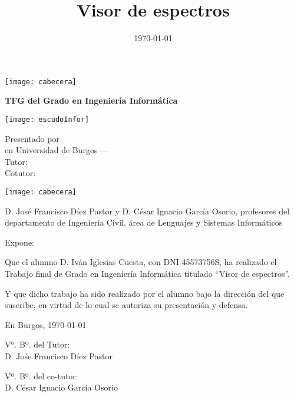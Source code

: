 \documentclass[a4paper,12pt,twoside]{memoir}
\title{Visor de espectros}
\author{\nombre}
\date{\today}
\makeatletter
\def\maketitle{
	\null
	\thispagestyle{empty}
	\noindent\texttt{[image: cabecera]}\vspace{1cm}%
	\vfill
	\colorbox{cpardoBox}{%
		\begin{minipage}{.8\textwidth}
			\vspace{.5cm}\Large
			\begin{center}
				\textbf{TFG del Grado en Ingeniería Informática}\vspace{.6cm}\\
				\textbf{\LARGE\@title{}}
			\end{center}
			\vspace{.2cm}
		\end{minipage}
		
	}%
	\hfill\begin{minipage}{.20\textwidth}
		\texttt{[image: escudoInfor]}
	\end{minipage}
	\vfill
	\begin{center}%
		{%
			\noindent\LARGE
			Presentado por \@author{}\\ 
			en Universidad de Burgos --- \@date{}\\
			Tutor: \@tutor{}\\
			Cotutor: \@cotutor{}\\
		}%
	\end{center}%
	\null
	\cleardoublepage
}
\newcommand{\nombre}{Iván Iglesias Cuesta} %
\makeatother
\begin{document}
	
	\maketitle
	
	
	\newpage\null\thispagestyle{empty}\newpage
	
	
	
	\thispagestyle{empty}
	
	
	\noindent\texttt{[image: cabecera]}\vspace{1cm}
	
	\noindent D. José Francisco Díez Pastor y D. César Ignacio García Osorio, profesores del
	departamento de Ingeniería Civil, área de Lenguajes y Sistemas Informáticos
	
	\noindent Expone:
	
	\noindent Que el alumno D. \nombre, con DNI 45573756S, ha realizado el Trabajo final
	de Grado en Ingeniería Informática titulado ``Visor de espectros''. 
	
	\noindent Y que dicho trabajo ha sido realizado por el alumno bajo la dirección
	del que suscribe, en virtud de lo cual se autoriza su presentación y defensa.
	
	\begin{center} %
		En Burgos, {\large \today}
	\end{center}
	
	\vfill\vfill\vfill
	
	\begin{minipage}{0.45\textwidth}
		\begin{flushleft} %
			Vº. Bº. del Tutor:\\[2cm]
			D. Jośe Francisco Díez Pastor
		\end{flushleft}
	\end{minipage}
	\hfill
	\begin{minipage}{0.45\textwidth}
		\begin{flushleft} %
			Vº. Bº. del co-tutor:\\[2cm]
			D. César Ignacio García Osorio
		\end{flushleft}
	\end{minipage}
	\hfill
	
	\vfill
	
	
\end{document}

